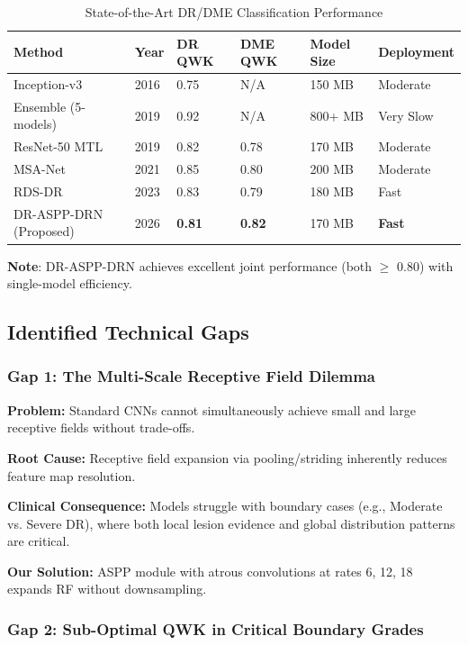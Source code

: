 \documentclass[12pt,a4paper]{article}
\begin{document}
\begin{table}[H]
\centering
\small
\caption{State-of-the-Art DR/DME Classification Performance}
\begin{tabular}{|p{2.2cm}|p{1.2cm}|p{1.2cm}|p{1.2cm}|p{1.2cm}|p{1.8cm}|}
\hline
\textbf{Method} & \textbf{Year} & \textbf{DR QWK} & \textbf{DME QWK} & \textbf{Model Size} & \textbf{Deployment} \\
\hline
Inception-v3 & 2016 & 0.75 & N/A & 150 MB & Moderate \\
Ensemble (5-models) & 2019 & 0.92 & N/A & 800+ MB & Very Slow \\
ResNet-50 MTL & 2019 & 0.82 & 0.78 & 170 MB & Moderate \\
MSA-Net & 2021 & 0.85 & 0.80 & 200 MB & Moderate \\
RDS-DR & 2023 & 0.83 & 0.79 & 180 MB & Fast \\
DR-ASPP-DRN (Proposed) & 2026 & \textbf{0.81} & \textbf{0.82} & 170 MB & \textbf{Fast} \\
\hline
\end{tabular}
\end{table}

\textbf{Note}: DR-ASPP-DRN achieves excellent joint performance (both $\geq$ 0.80) with single-model efficiency.

\subsection{Identified Technical Gaps}

\subsubsection{Gap 1: The Multi-Scale Receptive Field Dilemma}

\textbf{Problem:}
Standard CNNs cannot simultaneously achieve small and large receptive fields without trade-offs.

\textbf{Root Cause:}
Receptive field expansion via pooling/striding inherently reduces feature map resolution.

\textbf{Clinical Consequence:}
Models struggle with boundary cases (e.g., Moderate vs. Severe DR), where both local lesion evidence and global distribution patterns are critical.

\textbf{Our Solution:}
ASPP module with atrous convolutions at rates 6, 12, 18 expands RF without downsampling.

\subsubsection{Gap 2: Sub-Optimal QWK in Critical Boundary Grades}
\end{document}
